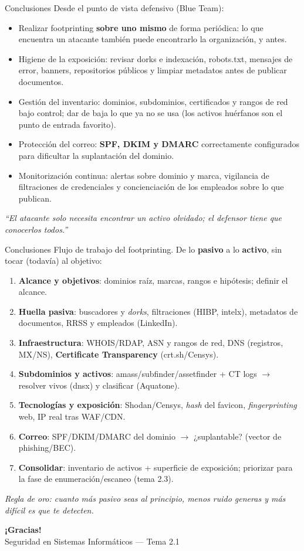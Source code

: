 \documentclass[aspectratio=169,11pt]{beamer}
\begin{document}
\begin{frame}{Conclusiones}
\footnotesize
Desde el punto de vista defensivo (Blue Team):
  \begin{itemize}
  \item Realizar footprinting \textbf{sobre uno mismo} de forma periódica: lo que encuentra un atacante también puede encontrarlo la organización, y antes.
  \item Higiene de la exposición: revisar dorks e indexación, robots.txt, mensajes de error, banners, repositorios públicos y limpiar metadatos antes de publicar documentos.
  \item Gestión del inventario: dominios, subdominios, certificados y rangos de red bajo control; dar de baja lo que ya no se usa (los activos huérfanos son el punto de entrada favorito).
  \item Protección del correo: \textbf{SPF, DKIM y DMARC} correctamente configurados para dificultar la suplantación del dominio.
  \item Monitorización continua: alertas sobre dominio y marca, vigilancia de filtraciones de credenciales y concienciación de los empleados sobre lo que publican.
  \end{itemize}
\vfill
\centering\textit{``El atacante solo necesita encontrar un activo olvidado; el defensor tiene que conocerlos todos.''}
\end{frame}



\begin{frame}[allowframebreaks]{Conclusiones}
\small
Flujo de trabajo del footprinting. De lo \textbf{pasivo} a lo \textbf{activo}, sin tocar (todavía) al objetivo:
  \begin{enumerate}
  \item \textbf{Alcance y objetivos}: dominios raíz, marcas, rangos e hipótesis; definir el alcance.
  \item \textbf{Huella pasiva}: buscadores y \emph{dorks}, filtraciones (HIBP, intelx), metadatos de documentos, RRSS y empleados (LinkedIn).
  \item \textbf{Infraestructura}: WHOIS/RDAP, ASN y rangos de red, DNS (registros, MX/NS), \textbf{Certificate Transparency} (crt.sh/Censys).
  \item \textbf{Subdominios y activos}: amass/subfinder/assetfinder + CT logs $\rightarrow$ resolver vivos (dnsx) y clasificar (Aquatone).
  \item \textbf{Tecnologías y exposición}: Shodan/Censys, \emph{hash} del favicon, \emph{fingerprinting} web, IP real tras WAF/CDN.
  \item \textbf{Correo}: SPF/DKIM/DMARC del dominio $\rightarrow$ ¿suplantable? (vector de phishing/BEC).
  \item \textbf{Consolidar}: inventario de activos + superficie de exposición; priorizar para la fase de enumeración/escaneo (tema 2.3).
  \end{enumerate}
\vfill
\footnotesize\textit{Regla de oro: cuanto más pasivo seas al principio, menos ruido generas y más difícil es que te detecten.}
\end{frame}

\begin{frame}[plain]
  \begin{center}
    {\Huge\bfseries\color{uznavy} ¡Gracias!}\\[1em]
    {\large Seguridad en Sistemas Informáticos --- Tema 2.1}
  \end{center}
\end{frame}
\end{document}

